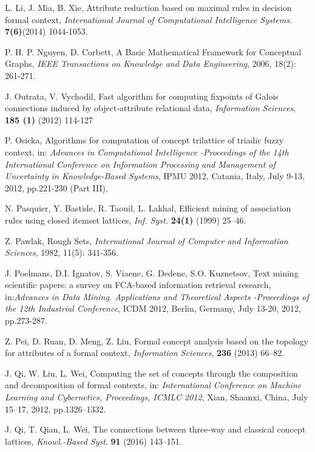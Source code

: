 \documentclass[11pt]{article}
\numberwithin{equation}{subsection}
\begin{document}
\begin{thebibliography}{aa}
L. Li,  J. Mia, B. Xie,
Attribute reduction based on maximal rules in decision formal context, \textit{ International Journal of Computational Intelligence Systems}.
\textbf{7(6)}(2014) 1044-1053.


P. H. P. Nguyen, D. Corbett,  A Basic Mathematical Framework
for Conceptual Graphs, \textit{IEEE Transactions on Knowledge and Data
Engineering}, 2006, 18(2): 261-271.

J. Outrata, V. Vychodil,
Fast algorithm for computing fixpoints of Galois connections induced by object-attribute relational data,
\textit{Information Sciences}, \textbf{185 (1)} (2012) 114-127



P. Osicka, Algorithms for computation of concept trilattice of triadic fuzzy context, in:\textit{ Advances in Computational Intelligence -Proceedings of the 14th International Conference on Information Processing and Management of Uncertainty in Knowledge-Based Systems}, IPMU 2012, Catania, Italy, July 9-13, 2012, pp.221-230 (Part III).


N. Pasquier, Y. Bastide, R. Taouil, L. Lakhal, Efficient mining of association rules using closed itemset lattices, \textit{Inf. Syst.} \textbf{24(1)} (1999) 25--46.

Z. Pawlak,  Rough Sets, \textit{International Journal of Computer and Information
Sciences}, 1982, 11(5): 341-356.


J. Poelmans, D.I. Ignatov, S. Viaene, G. Dedene, S.O. Kuznetsov, Text mining scientific papers: a survey on FCA-based information retrieval research, in:\textit{Advances in Data Mining. Applications and Theoretical Aspects -Proceedings of the 12th Industrial Conference}, ICDM 2012, Berlin, Germany, July 13-20,  2012, pp.273-287.



Z. Pei, D. Ruan, D. Meng, Z. Liu, Formal concept analysis based on the topology for attributes of a formal context, \textit{Information Sciences},  \textbf{236} (2013) 66--82.




J. Qi, W. Liu, L. Wei, Computing the set of concepts through the composition and decomposition of formal contexts, in: \textit{International Conference on Machine Learning and Cybernetics, Proceedings, ICMLC 2012}, Xian, Shaanxi, China, July 15--17,  2012, pp.1326--1332.

J. Qi, T. Qian, L. Wei, The connections between three-way and classical concept lattices, \textit{Knowl.-Based Syst}. \textbf{91} (2016) 143--151.





\end{thebibliography}
\end{document}
